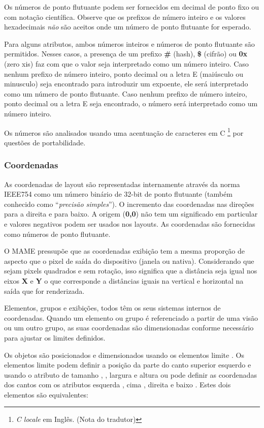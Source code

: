 \documentclass[letterpaper,10pt,brazil]{sphinxmanual}
\begin{document}
Os números de ponto flutuante podem ser fornecidos em decimal de ponto
fixo ou com notação científica. Observe que os prefixos de número
inteiro e os valores hexadecimais \emph{não} são aceitos onde um número de
ponto flutuante for esperado.

Para alguns atributos, ambos números inteiros e números de ponto
flutuante são permitidos. Nesses casos, a presença de um prefixo
\textbf{\#} (hash), \textbf{\$} (cifrão) ou \textbf{0x} (zero xis) faz com que o valor
seja interpretado como um número inteiro.
Caso nenhum prefixo de número inteiro, ponto decimal ou a letra E
(maiúsculo ou minusculo) seja encontrado para introduzir um expoente,
ele será interpretado como um número de ponto flutuante.
Caso nenhum prefixo de número inteiro, ponto decimal ou a letra E seja
encontrado, o número será interpretado como um número inteiro.

Os números são analisados usando uma acentuação de caracteres em C \footnote[3]{\sphinxAtStartFootnote%
\emph{C locale} em Inglês. (Nota do tradutor)
}
por questões de portabilidade.


\subsubsection{Coordenadas}
\label{techspecs/layout_files:layout-concepts-coordinates}\label{techspecs/layout_files:coordenadas}
As coordenadas de layout são representadas internamente através da norma
IEEE754 como um número binário de 32-bit de ponto flutuante (também
conhecido como ``\emph{precisão simples}''). O incremento das coordenadas
nas direções para a direita e para baixo. A origem (\textbf{0,0}) não tem um
significado em particular e valores negativos podem ser usados nos
layouts.
As coordenadas são fornecidas como números de ponto flutuante.

O MAME pressupõe que as coordenadas exibição tem a mesma proporção de
aspecto que o pixel de saída do dispositivo (janela ou nativa).
Considerando que sejam pixels quadrados e sem rotação, isso significa
que a distância seja igual nos eixos \textbf{X} e \textbf{Y} o que corresponde a
distâncias iguais na vertical e horizontal na saída que for renderizada.

Elementos, grupos e exibições, todos têm os seus sistemas internos
de coordenadas. Quando um elemento ou grupo é referenciado a partir de
uma visão ou um outro grupo, as suas coordenadas são dimensionadas
conforme necessário para ajustar os limites definidos.

Os objetos são posicionados e dimensionados usando os elementos limite
.
Os elementos limite podem definir a posição da parte do canto superior
esquerdo e usando o atributo de tamanho , , largura 
e altura  ou pode definir as coordenadas dos cantos com os
atributos esquerda , cima , direita  e baixo
. Estes dois elementos  são equivalentes:
\end{document}
